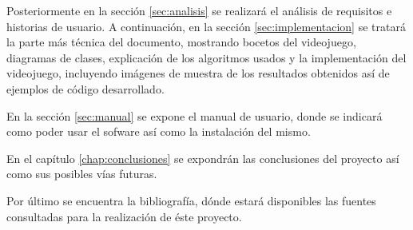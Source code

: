 Posteriormente en la sección \ref{sec:analisis} se realizará el análisis de requisitos e historias de usuario. A continuación, en la sección \ref{sec:implementacion} se tratará la parte más técnica del documento, mostrando bocetos del videojuego, diagramas de clases, explicación de los algoritmos usados y la implementación del videojuego, incluyendo imágenes de muestra de los resultados obtenidos así de ejemplos de código desarrollado.

En la sección \ref{sec:manual} se expone el manual de usuario, donde se indicará como poder usar el sofware así como la instalación del mismo.

En el capítulo \ref{chap:conclusiones} se expondrán las conclusiones del proyecto así como sus posibles vías futuras.

Por último se encuentra la bibliografía, dónde estará disponibles las fuentes consultadas para la realización de éste proyecto.